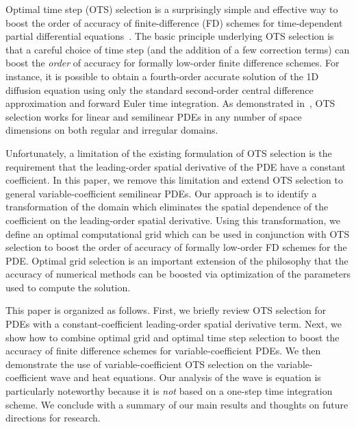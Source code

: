 \documentclass[twocolumn]{article} %
\makeatletter
\def\section{\@startsection {section}{1}{\z@}{1.0ex plus
1ex minus .2ex}{.2ex plus .2ex}{\large\bf}}
\makeatother
\begin{document}
\section{Introduction}
\label{Introduction}
Optimal time step (OTS) selection is a surprisingly simple and effective way to 
boost the order of accuracy of finite-difference (FD) schemes for 
time-dependent partial differential equations~\cite{chu_otspde}.  The basic
principle underlying OTS selection is that a careful choice of time step (and 
the addition of a few correction terms) can boost the \emph{order} of 
accuracy for formally low-order finite difference schemes.  For instance, it 
is possible to obtain a fourth-order accurate solution of the 1D diffusion 
equation using only the standard second-order central difference approximation 
and forward Euler time integration.  As demonstrated in~\cite{chu_otspde}, OTS 
selection works for linear and semilinear PDEs in any number of space 
dimensions on both regular and irregular domains.  

Unfortunately, a limitation of the existing formulation of OTS selection is 
the requirement that the leading-order spatial derivative of the PDE have a 
constant coefficient.  In this paper, we remove this limitation and extend OTS 
selection to general variable-coefficient semilinear PDEs.  
Our approach is to identify a transformation of the domain which 
eliminates the spatial dependence of the coefficient on the leading-order 
spatial derivative.  Using this transformation, we define an optimal 
computational grid which can be used in conjunction with OTS selection to 
boost the order of accuracy of formally low-order FD schemes for the PDE.  
Optimal grid selection is an important extension of the philosophy that the 
accuracy of numerical methods can be boosted via optimization of the 
parameters used to compute the solution.

This paper is organized as follows.  First, we briefly review OTS selection 
for PDEs with a constant-coefficient leading-order spatial derivative term.  
Next, we show how to combine optimal grid and optimal time step selection to 
boost the accuracy of finite difference schemes for variable-coefficient PDEs.  
We then demonstrate the use of variable-coefficient OTS selection on the 
variable-coefficient wave and heat equations.  Our analysis of the wave is 
equation is particularly noteworthy because it is \emph{not} based on a one-step 
time integration scheme.  We conclude with a summary of our main results
and thoughts on future directions for research.
\end{document}
